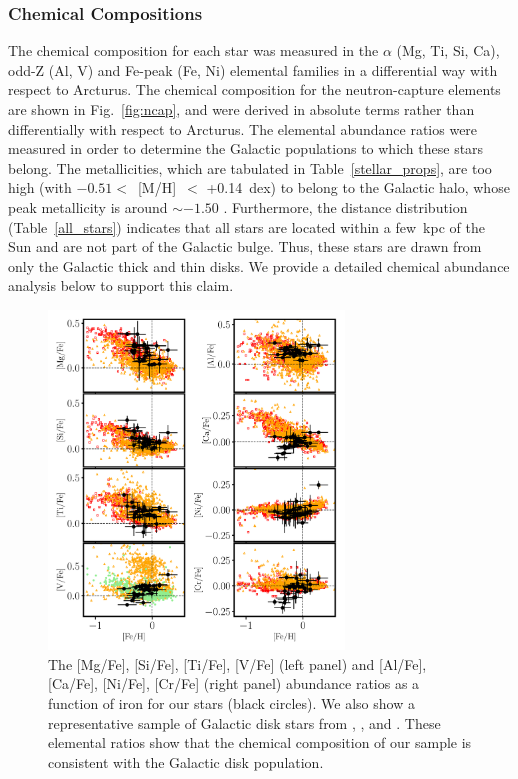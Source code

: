 \documentclass[a4paper,fleqn,usenatbib]{mnras}
\begin{document}
\subsubsection{Chemical Compositions}
\label{chemical}
The chemical composition for each star was measured in the $\alpha$ (Mg, Ti, Si, Ca), odd-Z (Al, V) and Fe-peak (Fe, Ni) elemental families in a differential way with respect to Arcturus. The chemical composition for the neutron-capture elements are shown in Fig.~\ref{fig:ncap}, and were derived in absolute terms rather than differentially with respect to Arcturus. The elemental abundance ratios were measured in order to determine the Galactic populations to which these stars belong. The metallicities, which are tabulated in Table~\ref{stellar_props}, are too high (with $-0.51<$~[M/H]~$<$ +0.14~dex) to belong to the Galactic halo, whose peak metallicity is around $\sim -1.50$ \cite[e.g.][]{Chiba2000}. Furthermore, the distance distribution (Table~\ref{all_stars}) indicates that all stars are located within a few~kpc of the Sun and are not part of the Galactic bulge. Thus, these stars are drawn from only the Galactic thick and thin disks. We provide a detailed chemical abundance analysis below to support this claim.\\

\begin{figure}
\noindent\includegraphics[width=0.7\textwidth,keepaspectratio]{Pope_alpha_oddZ.pdf}

\caption{\label{alphael}
The [Mg/Fe], [Si/Fe], [Ti/Fe], [V/Fe] (left panel) and [Al/Fe], [Ca/Fe], [Ni/Fe], [Cr/Fe] (right panel) abundance ratios as a function of iron for our stars (black circles). We also show a representative sample of Galactic disk stars from \citet[open red squares]{Bensby2014}, \citet[open orange squares]{Adibekyan2012}, and \citet[light green circles]{Battistini2015}. These elemental ratios show that the chemical composition of our sample is consistent with the Galactic disk population. } %
\end{figure}
\end{document}
